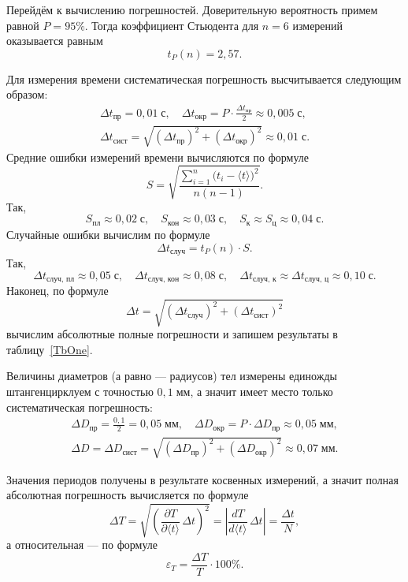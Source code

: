 Перейдём к вычислению погрешностей. Доверительную вероятность примем равной $P=95\%$. Тогда коэффициент Стьюдента для $n=6$ измерений оказывается равным
\[
t_P(n)=2{,}57.
\]

Для измерения времени систематическая погрешность высчитывается следующим образом:
\begin{gather*}
\Delta t_\text{пр}=0{,}01\;\text{с},\quad\Delta t_\text{окр}=P\cdot\frac{\Delta t_\text{пр}}{2}\approx0{,}005\;\text{с}, \\
\Delta t_\text{сист}=\sqrt{(\Delta t_\text{пр})^2+(\Delta t_\text{окр})^2}\approx0{,}01\;\text{с}.
\end{gather*}
Средние ошибки измерений времени вычисляются по формуле
\[
S=\sqrt{\frac{\sum\limits_{i=1}^n\bigl(t_i-\langle t\rangle\bigr)^2}{n(n-1)}}.
\]
Так,
\[
S_\text{пл}\approx0{,}02\;\text{с},\quad S_\text{кон}\approx0{,}03\;\text{с},\quad S_\text{к}\approx S_\text{ц}\approx0{,}04\;\text{с}.
\]
Случайные ошибки вычислим по формуле
\[
\Delta t_\text{случ}=t_P(n)\cdot S.
\]
Так,
\[
\Delta t_\text{случ, пл}\approx0{,}05\;\text{с},\quad\Delta t_\text{случ, кон}\approx0{,}08\;\text{с},\quad\Delta t_\text{случ, к}\approx\Delta t_\text{случ, ц}\approx0{,}10\;\text{с}.
\]
Наконец, по формуле
\[
\Delta t=\sqrt{(\Delta t_\text{случ})^2+(\Delta t_\text{сист})^2}
\]
вычислим абсолютные полные погрешности и запишем результаты в таблицу~\ref{TbOne}.

Величины диаметров (а равно --- радиусов) тел измерены единожды штангенцирклуем с точностью $0{,}1\;\text{мм}$, а значит имеет место только систематическая погрешность:
\begin{gather*}
\Delta D_\text{пр}=\frac{0{,}1}{2}=0{,}05\;\text{мм},\quad\Delta D_\text{окр}=P\cdot\Delta D_\text{пр}\approx0{,}05\;\text{мм}, \\
\Delta D=\Delta D_\text{сист}=\sqrt{(\Delta D_\text{пр})^2+(\Delta D_\text{окр})^2}\approx0{,}07\;\text{мм}.
\end{gather*}

Значения периодов получены в результате косвенных измерений, а значит полная абсолютная погрешность вычисляется по формуле
\[
\Delta T=\sqrt{\left(\frac{\partial T}{\partial\langle t\rangle}\,\Delta t\right)^2}=\left|\frac{dT}{d\langle t\rangle}\,\Delta t\right|=\frac{\Delta t}{N},
\]
а относительная --- по формуле
\[
\varepsilon_T=\frac{\Delta T}{T}\cdot100\%.
\]

